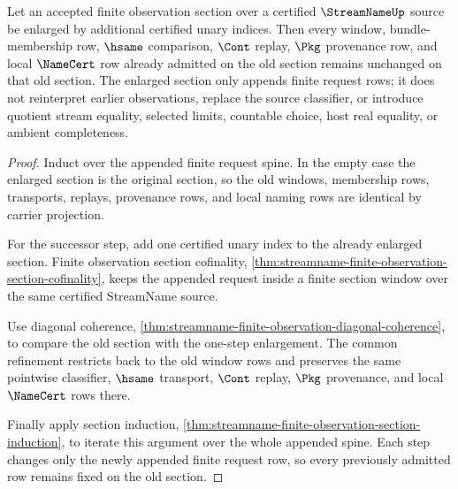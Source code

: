 \begin{theorem}
\label{thm:streamname-finite-observation-section-monotone-extension}
Let an accepted finite observation section over a certified $\StreamNameUp$ source be enlarged by additional certified unary indices. Then every window, bundle-membership row, $\hsame$ comparison, $\Cont$ replay, $\Pkg$ provenance row, and local $\NameCert$ row already admitted on the old section remains unchanged on that old section. The enlarged section only appends finite request rows; it does not reinterpret earlier observations, replace the source classifier, or introduce quotient stream equality, selected limits, countable choice, host real equality, or ambient completeness.
\end{theorem}
\begin{proof}
Induct over the appended finite request spine. In the empty case the enlarged section is the original section, so the old windows, membership rows, transports, replays, provenance rows, and local naming rows are identical by carrier projection.

For the successor step, add one certified unary index to the already enlarged section. Finite observation section cofinality, \autoref{thm:streamname-finite-observation-section-cofinality}, keeps the appended request inside a finite section window over the same certified StreamName source.

Use diagonal coherence, \autoref{thm:streamname-finite-observation-diagonal-coherence}, to compare the old section with the one-step enlargement. The common refinement restricts back to the old window rows and preserves the same pointwise classifier, $\hsame$ transport, $\Cont$ replay, $\Pkg$ provenance, and local $\NameCert$ rows there.

Finally apply section induction, \autoref{thm:streamname-finite-observation-section-induction}, to iterate this argument over the whole appended spine. Each step changes only the newly appended finite request row, so every previously admitted row remains fixed on the old section.
\end{proof}

